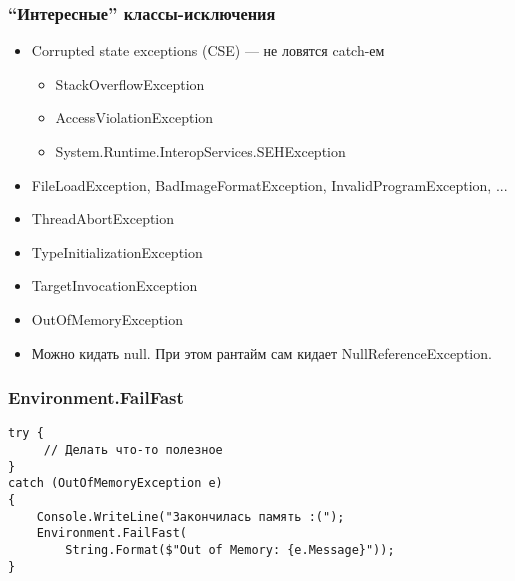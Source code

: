 \documentclass[xetex,mathserif,serif]{beamer}
\begin{document}
	\begin{frame}
		\frametitle{``Интересные'' классы-исключения}
		\begin{itemize}
			\item Corrupted state exceptions (CSE) --- не ловятся catch-ем
			\begin{itemize}
				\item StackOverflowException
				\item AccessViolationException
				\item System.Runtime.InteropServices.SEHException
			\end{itemize}
			\item FileLoadException, BadImageFormatException, InvalidProgramException, ...
			\item ThreadAbortException
			\item TypeInitializationException
			\item TargetInvocationException
			\item OutOfMemoryException
			\item Можно кидать null. При этом рантайм сам кидает NullReferenceException.
		\end{itemize}
	\end{frame}

	\begin{frame}[fragile]
		\frametitle{Environment.FailFast}
		\begin{verbatim}
try {
     // Делать что-то полезное
}
catch (OutOfMemoryException e) 
{
    Console.WriteLine("Закончилась память :(");
    Environment.FailFast(
        String.Format($"Out of Memory: {e.Message}"));
}
		\end{verbatim}
	\end{frame}
\end{document}
